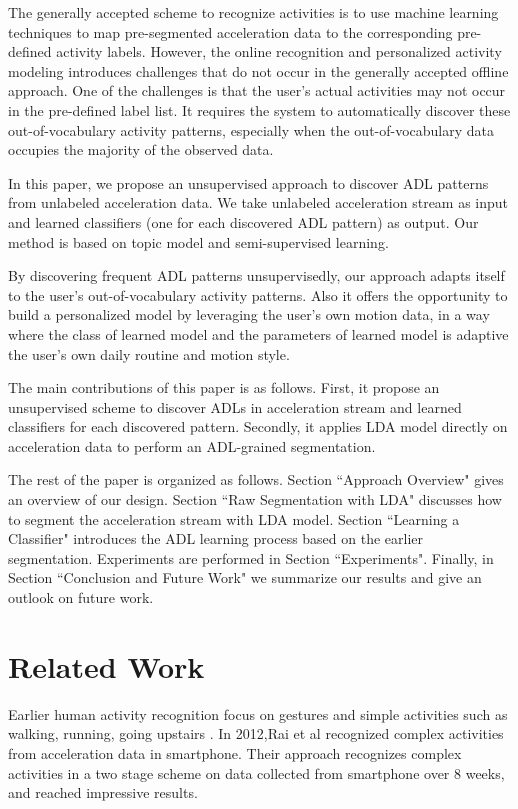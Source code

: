 \documentclass{sigchi}
\begin{document}
The generally accepted scheme to recognize activities is to use machine learning techniques to map pre-segmented acceleration data to the corresponding pre-defined activity labels.
However, the online recognition and personalized activity modeling introduces challenges that do not occur in the generally accepted offline approach.
One of the challenges is that the user's actual activities may not occur in the pre-defined label list. It requires the system to automatically discover these out-of-vocabulary activity patterns, especially when the out-of-vocabulary data occupies the majority of the observed data.

In this paper, we propose an unsupervised approach to discover ADL patterns from unlabeled acceleration data.
We take unlabeled acceleration stream as input and learned classifiers (one for each discovered ADL pattern) as output. Our method is based on topic model and semi-supervised learning.

By discovering frequent ADL patterns unsupervisedly, our approach adapts itself to the user's out-of-vocabulary activity patterns. Also it offers the opportunity to build a personalized model by leveraging the user's own motion data, in a way where the class of learned model and the parameters of learned model is adaptive the user's own daily routine and motion style.

The main contributions of this paper is as follows.
First, it propose an unsupervised scheme to discover ADLs in acceleration stream and learned classifiers for each discovered pattern.
Secondly, it applies LDA model directly on acceleration data to perform an ADL-grained segmentation.

The rest of the paper is organized as follows.
Section ``Approach Overview" gives an overview of our design.
Section ``Raw Segmentation with LDA" discusses how to segment the acceleration stream with LDA model. Section ``Learning a Classifier" introduces the ADL learning process based on the earlier segmentation. Experiments are performed in Section ``Experiments".
Finally, in Section ``Conclusion and Future Work" we summarize our results and give an outlook on future work.


\section{Related Work}
\label{sec.related-work}

Earlier human activity recognition focus on gestures and simple activities such as walking, running, going upstairs \cite{kwapisz2011activity, liang1998real, mantyjarvi2001recognizing}.
In 2012,Rai et al \cite{rai2012mining} recognized complex activities from acceleration data in smartphone. Their approach recognizes complex activities in a two stage scheme on data collected from smartphone over 8 weeks, and reached impressive results.
\end{document}
